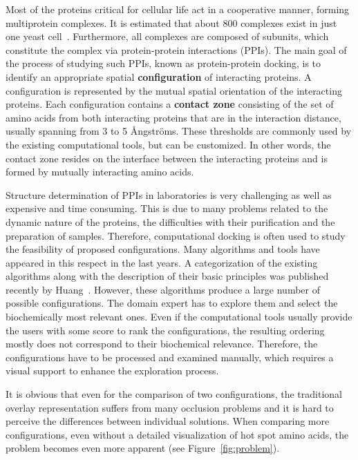 \documentclass{bmcart}
\begin{document}
Most of the proteins critical for cellular life act in a cooperative manner, forming multiprotein complexes. 
It is estimated that about 800 complexes exist in just one yeast cell~\cite{Gavin}. 
Furthermore, all complexes are composed of subunits, which constitute the complex via protein-protein interactions (PPIs).
The main goal of the process of studying such PPIs, known as protein-protein docking, is to identify an appropriate spatial \textbf{configuration} of interacting proteins.
A configuration is represented by the mutual spatial orientation of the interacting proteins.
Each configuration contains a \textbf{contact zone} consisting of the set of amino acids from both interacting proteins that are in the interaction distance, usually spanning from 3 to 5 \AA ngstr\"{o}ms.
These thresholds are commonly used by the existing computational tools, but can be customized.
In other words, the contact zone resides on the interface between the interacting proteins and is formed by mutually interacting amino acids.

Structure determination of PPIs in laboratories is very challenging as well as expensive and time consuming.
This is due to many problems related to the dynamic nature of the proteins, the difficulties with their purification and the preparation of samples.
Therefore, computational docking is often used to study the feasibility of proposed configurations.
Many algorithms and tools have appeared in this respect in the last years.
A categorization of the existing algorithms along with the description of their basic principles was published recently by Huang~\cite{Huang2014}.
However, these algorithms produce a large number of possible configurations.
The domain expert has to explore them and select the biochemically most relevant ones. 
Even if the computational tools usually provide the users with some score to rank the configurations, the resulting ordering mostly does not correspond to their biochemical relevance.
Therefore, the configurations have to be processed and examined manually, which requires a visual support to enhance the exploration process.

It is obvious that even for the comparison of two configurations, the traditional overlay representation suffers from many occlusion problems and it is hard to perceive the differences between individual solutions.
When comparing more configurations, even without a detailed visualization of hot spot amino acids, the problem becomes even more apparent (see Figure~\ref{fig:problem}).
\end{document}
